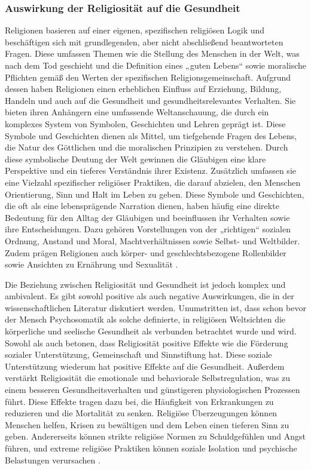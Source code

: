 \subsubsection{Auswirkung der Religiosität auf die Gesundheit}    \label{subsubsec_2.1.1.1}
Religionen basieren auf einer eigenen, spezifischen religiösen Logik und beschäftigen sich mit grundlegenden, aber nicht abschließend beantworteten Fragen. Diese umfassen Themen wie die Stellung des Menschen in der Welt, was nach dem Tod geschieht und die Definition eines „guten Lebens“ sowie moralische Pflichten gemäß den Werten der spezifischen Religionsgemeinschaft. Aufgrund dessen haben Religionen einen erheblichen Einfluss auf Erziehung, Bildung, Handeln und auch auf die Gesundheit und gesundheitsrelevantes Verhalten. Sie bieten ihren Anhängern eine umfassende Weltanschauung, die durch ein komplexes System von Symbolen, Geschichten und Lehren geprägt ist. Diese Symbole und Geschichten dienen als Mittel, um tiefgehende Fragen des Lebens, die Natur des Göttlichen und die moralischen Prinzipien zu verstehen. Durch diese symbolische Deutung der Welt gewinnen die Gläubigen eine klare Perspektive und ein tieferes Verständnis ihrer Existenz. Zusätzlich umfassen sie eine Vielzahl spezifischer religiöser Praktiken, die darauf abzielen, den Menschen Orientierung, Sinn und Halt im Leben zu geben. Diese Symbole und Geschichten, die oft als eine lebensprägende Narration dienen, haben häufig eine direkte Bedeutung für den Alltag der Gläubigen und beeinflussen ihr Verhalten sowie ihre Entscheidungen. Dazu gehören Vorstellungen von der „richtigen“ sozialen Ordnung, Anstand und Moral, Machtverhältnissen sowie Selbst- und Weltbilder. Zudem prägen Religionen auch körper- und geschlechtsbezogene Rollenbilder sowie Ansichten zu Ernährung und Sexualität \parencite{Hemel2023}.

Die Beziehung zwischen Religiosität und Gesundheit ist jedoch komplex und ambivalent. Es gibt sowohl positive als auch negative Auswirkungen, die in der wissenschaftlichen Literatur diskutiert werden. Unumstritten ist, dass schon bevor der Mensch Psychosomatik als solche definierte, in religiösen Weltsichten die körperliche und seelische Gesundheit als verbunden betrachtet wurde und wird. Sowohl \textcite{Hemel2023} als auch \textcite{Jakobs_2018} betonen, dass Religiosität positive Effekte wie die Förderung sozialer Unterstützung, Gemeinschaft und Sinnstiftung hat. Diese soziale Unterstützung wiederum hat positive Effekte auf die Gesundheit. Außerdem verstärkt Religiosität die emotionale und behaviorale Selbstregulation, was zu einem besseren Gesundheitsverhalten und günstigeren physiologischen Prozessen führt. Diese Effekte tragen dazu bei, die Häufigkeit von Erkrankungen zu reduzieren und die Mortalität zu senken. Religiöse Überzeugungen können Menschen helfen, Krisen zu bewältigen und dem Leben einen tieferen Sinn zu geben. Andererseits können strikte religiöse Normen zu Schuldgefühlen und Angst führen, und extreme religiöse Praktiken können soziale Isolation und psychische Belastungen verursachen \parencite{Krause2015}.


